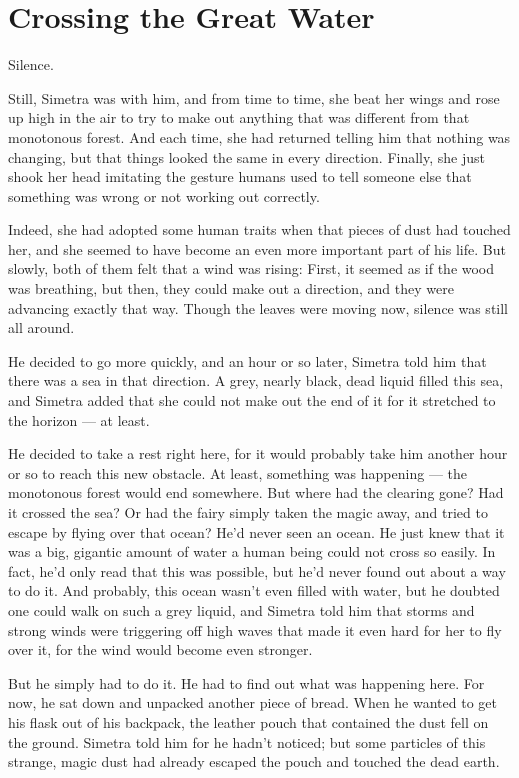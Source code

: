 \chapter{Crossing the Great Water}
\label{cha:crossing-great-water}
Silence.

Still, Simetra was with him, and from time to time, she beat her wings and rose up high in the air to try to make out anything that was different from that monotonous forest. And each time, she had returned telling him that nothing was changing, but that things looked the same in every direction. Finally, she just shook her head imitating the gesture humans used to tell someone else that something was wrong or not working out correctly.

Indeed, she had adopted some human traits when that pieces of dust had touched her, and she seemed to have become an even more important part of his life. 
But slowly, both of them felt that a wind was rising: First, it seemed as if the wood was breathing, but then, they could make out a direction, and they were advancing exactly that way. Though the leaves were moving now, silence was still all around.

He decided to go more quickly, and an hour or so later, Simetra told him that there was a sea in that direction. A grey, nearly black, dead liquid filled this sea, and Simetra added that she could not make out the end of it for it stretched to the horizon --- at least.

He decided to take a rest right here, for it would probably take him another hour or so to reach this new obstacle. At least, something was happening --- the monotonous forest would end somewhere. 
But where had the clearing gone? 
Had it crossed the sea? Or had the fairy simply taken the magic away, and tried to escape by flying over that ocean? 
He'd never seen an ocean. He just knew that it was a big, gigantic amount of water a human being could not cross so easily. In fact, he'd only read that this was possible, but he'd never found out about a way to do it. 
And probably, this ocean wasn't even filled with water, but he doubted one could walk on such a grey liquid, and Simetra told him that storms and strong winds were triggering off high waves that made it even hard for her to fly over it, for the wind would become even stronger.

But he simply had to do it. 
He had to find out what was happening here. 
For now, he sat down and unpacked another piece of bread. 
When he wanted to get his flask out of his backpack, the leather pouch that contained the dust fell on the ground. Simetra told him for he hadn't noticed; but some particles of this strange, magic dust had already escaped the pouch and touched the dead earth.

